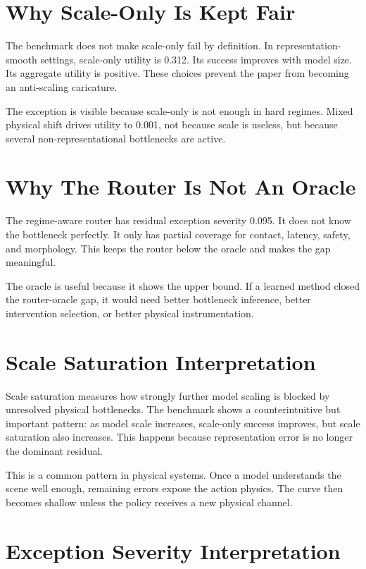 \section{Why Scale-Only Is Kept Fair}

The benchmark does not make scale-only fail by definition. In representation-smooth settings, scale-only utility is 0.312. Its success improves with model size. Its aggregate utility is positive. These choices prevent the paper from becoming an anti-scaling caricature.

The exception is visible because scale-only is not enough in hard regimes. Mixed physical shift drives utility to 0.001, not because scale is useless, but because several non-representational bottlenecks are active.

\section{Why The Router Is Not An Oracle}

The regime-aware router has residual exception severity 0.095. It does not know the bottleneck perfectly. It only has partial coverage for contact, latency, safety, and morphology. This keeps the router below the oracle and makes the gap meaningful.

The oracle is useful because it shows the upper bound. If a learned method closed the router-oracle gap, it would need better bottleneck inference, better intervention selection, or better physical instrumentation.

\section{Scale Saturation Interpretation}

Scale saturation measures how strongly further model scaling is blocked by unresolved physical bottlenecks. The benchmark shows a counterintuitive but important pattern: as model scale increases, scale-only success improves, but scale saturation also increases. This happens because representation error is no longer the dominant residual.

This is a common pattern in physical systems. Once a model understands the scene well enough, remaining errors expose the action physics. The curve then becomes shallow unless the policy receives a new physical channel.

\section{Exception Severity Interpretation}

